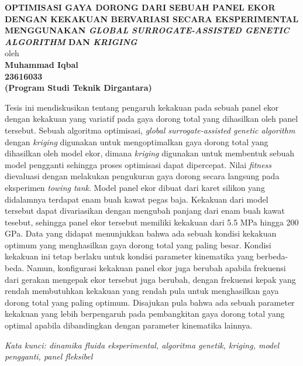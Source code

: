 \begin{center}{
    \textbf{OPTIMISASI GAYA DORONG DARI SEBUAH PANEL EKOR DENGAN KEKAKUAN BERVARIASI SECARA EKSPERIMENTAL MENGGUNAKAN \textit{GLOBAL SURROGATE-ASSISTED GENETIC ALGORITHM} DAN \textit{KRIGING}}\\
    oleh\\
    \textbf{
        Muhammad Iqbal\\
        23616033\\
        (Program Studi Teknik Dirgantara)
    }
}
\end{center}
Tesis ini mendiskusikan tentang pengaruh kekakuan pada sebuah panel ekor dengan kekakuan yang variatif pada gaya dorong total yang dihasilkan oleh panel tersebut. Sebuah algoritma optimisasi, \textit{global surrogate-assisted genetic algorithm} dengan \textit{kriging} digunakan untuk mengoptimalkan gaya dorong total yang dihasilkan oleh model ekor, dimana \textit{kriging} digunakan untuk membentuk sebuah model pengganti sehingga proses optimisasi dapat dipercepat. Nilai \textit{fitness} dievaluasi dengan melakukan pengukuran gaya dorong secara langsung pada eksperimen \textit{towing tank}. Model panel ekor dibuat dari karet silikon yang didalamnya terdapat enam buah kawat pegas baja. Kekakuan dari model tersebut dapat divariasikan dengan mengubah panjang dari enam buah kawat tesebut, sehingga panel ekor tersebut memiliki kekakuan dari 5.5 MPa hingga 200 GPa. Data yang didapat menunjukkan bahwa ada sebuah kondisi kekakuan optimum yang menghasilkan gaya dorong total yang paling besar. Kondisi kekakuan ini tetap berlaku untuk kondisi parameter kinematika yang berbeda-beda. Namun, konfigurasi kekakuan panel ekor juga berubah apabila frekuensi dari gerakan mengepak ekor tersebut juga berubah, dengan frekuensi kepak yang rendah membutuhkan kekakuan yang rendah pula untuk menghasilkan gaya dorong total yang paling optimum. Disajukan pula bahwa ada sebuah parameter kekakuan yang lebih berpengaruh pada pembangkitan gaya dorong total yang optimal apabila dibandingkan dengan parameter kinematika lainnya.\par
\textit{Kata kunci: dinamika fluida eksperimental, algoritma genetik, \textit{kriging}, model pengganti, panel fleksibel}
